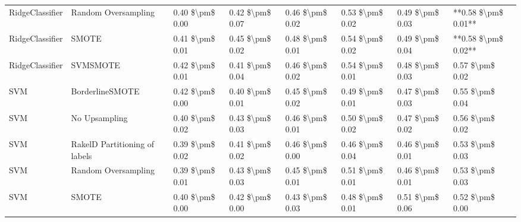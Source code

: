 \begin{tabular}{llllllll}
                RidgeClassifier &           Random Oversampling & 0.40 \$\textbackslash pm\$ 0.00 &           0.42 \$\textbackslash pm\$ 0.07 &       0.46 \$\textbackslash pm\$ 0.02 &        0.53 \$\textbackslash pm\$ 0.02 &                         0.49 \$\textbackslash pm\$ 0.03 & **0.58 \$\textbackslash pm\$ 0.01** \\
                RidgeClassifier &                         SMOTE & 0.41 \$\textbackslash pm\$ 0.01 &           0.45 \$\textbackslash pm\$ 0.02 &       0.48 \$\textbackslash pm\$ 0.01 &        0.54 \$\textbackslash pm\$ 0.02 &                         0.49 \$\textbackslash pm\$ 0.04 & **0.58 \$\textbackslash pm\$ 0.02** \\
                RidgeClassifier &                      SVMSMOTE & 0.42 \$\textbackslash pm\$ 0.01 &           0.41 \$\textbackslash pm\$ 0.04 &       0.46 \$\textbackslash pm\$ 0.02 &        0.54 \$\textbackslash pm\$ 0.01 &                         0.48 \$\textbackslash pm\$ 0.03 &     0.57 \$\textbackslash pm\$ 0.02 \\
                            SVM &               BorderlineSMOTE & 0.42 \$\textbackslash pm\$ 0.00 &           0.40 \$\textbackslash pm\$ 0.01 &       0.45 \$\textbackslash pm\$ 0.02 &        0.49 \$\textbackslash pm\$ 0.01 &                         0.47 \$\textbackslash pm\$ 0.03 &     0.55 \$\textbackslash pm\$ 0.04 \\
                            SVM &                 No Upsampling & 0.40 \$\textbackslash pm\$ 0.02 &           0.43 \$\textbackslash pm\$ 0.03 &       0.46 \$\textbackslash pm\$ 0.01 &        0.50 \$\textbackslash pm\$ 0.02 &                         0.47 \$\textbackslash pm\$ 0.02 &     0.56 \$\textbackslash pm\$ 0.02 \\
                            SVM & RakelD Partitioning of labels & 0.39 \$\textbackslash pm\$ 0.02 &           0.41 \$\textbackslash pm\$ 0.02 &       0.46 \$\textbackslash pm\$ 0.00 &        0.46 \$\textbackslash pm\$ 0.04 &                         0.46 \$\textbackslash pm\$ 0.01 &     0.53 \$\textbackslash pm\$ 0.03 \\
                            SVM &           Random Oversampling & 0.39 \$\textbackslash pm\$ 0.01 &           0.43 \$\textbackslash pm\$ 0.03 &       0.45 \$\textbackslash pm\$ 0.01 &        0.51 \$\textbackslash pm\$ 0.01 &                         0.46 \$\textbackslash pm\$ 0.01 &     0.53 \$\textbackslash pm\$ 0.03 \\
                            SVM &                         SMOTE & 0.40 \$\textbackslash pm\$ 0.00 &           0.42 \$\textbackslash pm\$ 0.00 &       0.43 \$\textbackslash pm\$ 0.03 &        0.48 \$\textbackslash pm\$ 0.01 &                         0.51 \$\textbackslash pm\$ 0.06 &     0.52 \$\textbackslash pm\$ 0.00 \\

\end{tabular}
